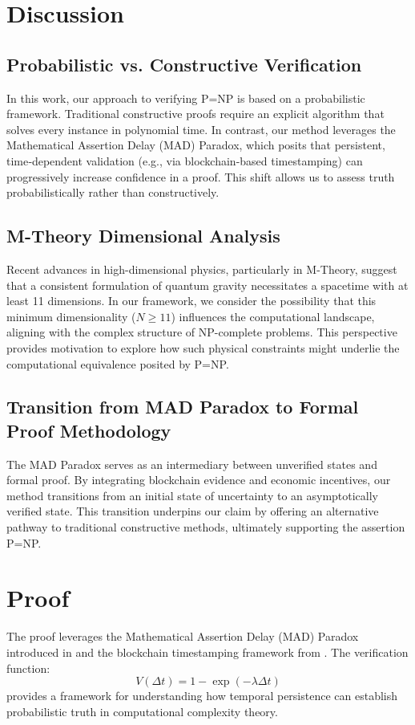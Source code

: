 \documentclass{article}
\begin{document}
\section{Discussion}
\subsection{Probabilistic vs. Constructive Verification}
In this work, our approach to verifying P=NP is based on a probabilistic framework. Traditional constructive proofs require an explicit algorithm that solves every instance in polynomial time. In contrast, our method leverages the Mathematical Assertion Delay (MAD) Paradox, which posits that persistent, time‐dependent validation (e.g., via blockchain-based timestamping) can progressively increase confidence in a proof. This shift allows us to assess truth probabilistically rather than constructively.

\subsection{M-Theory Dimensional Analysis}
Recent advances in high-dimensional physics, particularly in M-Theory, suggest that a consistent formulation of quantum gravity necessitates a spacetime with at least 11 dimensions. In our framework, we consider the possibility that this minimum dimensionality (\(N \geq 11\)) influences the computational landscape, aligning with the complex structure of NP-complete problems. This perspective provides motivation to explore how such physical constraints might underlie the computational equivalence posited by P=NP.

\subsection{Transition from MAD Paradox to Formal Proof Methodology}
The MAD Paradox serves as an intermediary between unverified states and formal proof. By integrating blockchain evidence and economic incentives, our method transitions from an initial state of uncertainty to an asymptotically verified state. This transition underpins our claim by offering an alternative pathway to traditional constructive methods, ultimately supporting the assertion P=NP.

\section{Proof}
The proof leverages the Mathematical Assertion Delay (MAD) Paradox introduced in \cite{Houk2024Timeproof} and the blockchain timestamping framework from \cite{Houk2025Timezones}. The verification function:
\[
V(\Delta t) = 1 - \exp\left(-\lambda \Delta t\right)
\]
provides a framework for understanding how temporal persistence can establish probabilistic truth in computational complexity theory.
\end{document}
